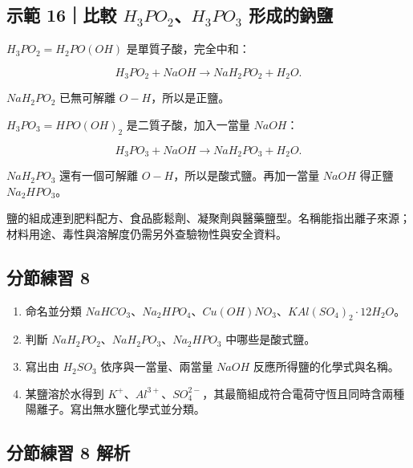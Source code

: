 \documentclass[11pt,a4paper]{article}
\providecommand{\tightlist}{%
  \setlength{\itemsep}{0pt}\setlength{\parskip}{0pt}}
\begin{document}
\begin{HandoutWorkedExample}

\subsection{\texorpdfstring{示範 16｜比較 \(H_3PO_2\)、\(H_3PO_3\) 形成的鈉鹽}{示範 16｜比較 H\_3PO\_2、H\_3PO\_3 形成的鈉鹽}}\label{ux793aux7bc4-16ux6bd4ux8f03-h_3po_2h_3po_3-ux5f62ux6210ux7684ux9209ux9e7d}

\(H_3PO_2=H_2PO(OH)\) 是單質子酸，完全中和：

\[
H_3PO_2+NaOH\rightarrow NaH_2PO_2+H_2O.
\]

\(NaH_2PO_2\) 已無可解離 \(O-H\)，所以是正鹽。

\(H_3PO_3=HPO(OH)_2\) 是二質子酸，加入一當量 \(NaOH\)：

\[
H_3PO_3+NaOH\rightarrow NaH_2PO_3+H_2O.
\]

\(NaH_2PO_3\) 還有一個可解離 \(O-H\)，所以是酸式鹽。再加一當量 \(NaOH\) 得正鹽 \(Na_2HPO_3\)。

\end{HandoutWorkedExample}

鹽的組成連到肥料配方、食品膨鬆劑、凝聚劑與醫藥鹽型。名稱能指出離子來源；材料用途、毒性與溶解度仍需另外查驗物性與安全資料。

\subsection{分節練習 8}\label{ux5206ux7bc0ux7df4ux7fd2-8}

\begin{enumerate}
\def\labelenumi{\arabic{enumi}.}
\tightlist
\item
  命名並分類 \(NaHCO_3\)、\(Na_2HPO_4\)、\(Cu(OH)NO_3\)、\(KAl(SO_4)_2\cdot12H_2O\)。
\item
  判斷 \(NaH_2PO_2\)、\(NaH_2PO_3\)、\(Na_2HPO_3\) 中哪些是酸式鹽。
\item
  寫出由 \(H_2SO_3\) 依序與一當量、兩當量 \(NaOH\) 反應所得鹽的化學式與名稱。
\item
  某鹽溶於水得到 \(K^+\)、\(Al^{3+}\)、\(SO_4^{2-}\)，其最簡組成符合電荷守恆且同時含兩種陽離子。寫出無水鹽化學式並分類。
\end{enumerate}

\subsection{分節練習 8 解析}\label{ux5206ux7bc0ux7df4ux7fd2-8-ux89e3ux6790}
\end{document}
